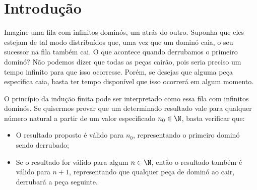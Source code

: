 \section{Introdução}

Imagine uma fila com infinitos dominós, um atrás do outro. Suponha que eles estejam de tal modo distribuídos que, uma vez que um dominó
caia, o seu sucessor na fila também cai. O que acontece quando derrubamos o primeiro dominó? Não podemos dizer que todas as peças cairão, pois seria preciso um tempo infinito para que isso ocorresse. Porém, se desejas que alguma peça específica caia, basta ter tempo disponível que isso ocorrerá em algum momento.

O princípio da indução finita pode ser interpretado como essa fila com infinitos dominós. Se quisermos provar que um determinado resultado vale para qualquer número natural a partir de um valor especificado $n_0 \in \N$, basta verificar que: 
\begin{itemize}
    \item O resultado proposto é válido para $n_0$, representando o primeiro dominó sendo derrubado;
    \item Se o resultado for válido para algum $n \in \N$, então o resultado também é válido para $n+1$, representando que qualquer peça de dominó ao cair, derrubará a peça seguinte.
\end{itemize}